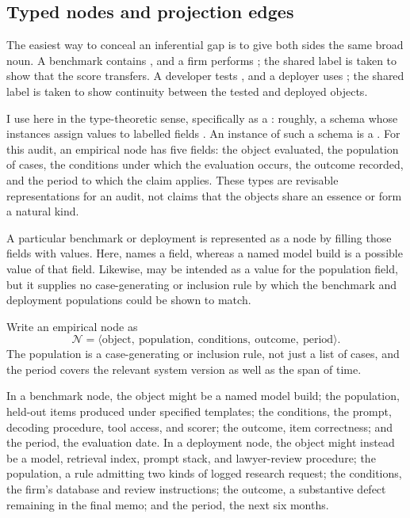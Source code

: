 \documentclass[12pt]{article}
\begin{document}
\subsection{Typed nodes and projection edges}\label{ssec:typed}

The easiest way to conceal an inferential gap is to give both sides the same broad noun. A benchmark contains , and a firm performs ; the shared label is taken to show that the score transfers. A developer tests , and a deployer uses ; the shared label is taken to show continuity between the tested and deployed objects.

I use  here in the type-theoretic sense, specifically as a : roughly, a schema whose instances assign values to labelled fields \citep[sec.~11.8]{pierce2002types}. An instance of such a schema is a . For this audit, an empirical node has five fields: the object evaluated, the population of cases, the conditions under which the evaluation occurs, the outcome recorded, and the period to which the claim applies. These types are revisable representations for an audit, not claims that the objects share an essence or form a natural kind.

A particular benchmark or deployment is represented as a node by filling those fields with values. Here,  names a field, whereas a named model build is a possible value of that field. Likewise,  may be intended as a value for the population field, but it supplies no case-generating or inclusion rule by which the benchmark and deployment populations could be shown to match.

Write an empirical node as
\begin{equation}\label{eq:node}
\mathcal{N}=\langle\text{object},\ \text{population},\ \text{conditions},\ \text{outcome},\ \text{period}\rangle.
\end{equation}
The population is a case-generating or inclusion rule, not just a list of cases, and the period covers the relevant system version as well as the span of time.

In a benchmark node, the object might be a named model build; the population, held-out items produced under specified templates; the conditions, the prompt, decoding procedure, tool access, and scorer; the outcome, item correctness; and the period, the evaluation date. In a deployment node, the object might instead be a model, retrieval index, prompt stack, and lawyer-review procedure; the population, a rule admitting two kinds of logged research request; the conditions, the firm's database and review instructions; the outcome, a substantive defect remaining in the final memo; and the period, the next six months.
\end{document}
